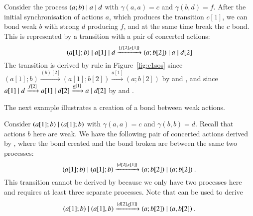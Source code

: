{\begin{example}\label{ex:examp1}
{\rm Consider the process $(a;b) \; \vert \; a \; \vert \; d$ with $\gamma(a,a)=c$ and $\gamma(b,d)=f$. After the
initial synchronisation of actions $a$, which produces the transition $c[1]$, we can bond weak $b$ with strong $d$ producing $f$, and at the same time break the $c$ bond. This is represented by a transition
with a pair of concerted actions:
$$(a[1];b) \; \vert \; a[1] \; \vert \;  d \xrightarrow{\{f[2], \underline{c}[1]\}} 
  (a;b[2])\; \vert \; a \; \vert \; d[2]$$
The transition is derived by rule  in Figure~\ref{fig:c1sos}
 since $(a[1];b) \xrightarrow{(b)[2]} (a[1];b[2]) \xrightarrow{\underline{a}[1]} (a;b[2])$ by  and , 
and since $a[1] \; \vert \; d \xrightarrow{f[2]} a[1] \; \vert \; d[2] \xrightarrow{\underline{a}[1]} a \; \vert \; d[2]$
by  and .}
\end{example}
%
The next example illustrates a creation of a bond between weak actions.
\begin{example}\label{ex:examp2}
{\rm Consider $(a[1];b)\; \vert \; (a[1];b)$ with $\gamma(a,a)=c$ and $\gamma(b,b)=d$. Recall that actions $b$ here are weak.
We have the following pair of concerted actions derived by , where the bond created and the bond broken are between the same two processes:
 $$(a[1];b)\; \vert \; (a[1];b)  \xrightarrow{\{d[2], \underline{c}[1]\}} 
(a;b[2])\; \vert \; (a;b[2])\ . $$
This transition cannot be derived by  because we only have two processes here and  requires at least three separate processes. Note that  can be used to derive  
  $$(a[1];b)\; \vert \; (a[1], b)  \xrightarrow{\{d[2], \underline{c}[1]\}} (a;b[2])\; \vert \; (a, b[2])\ . $$
 }
\end{example}

%
%
}
